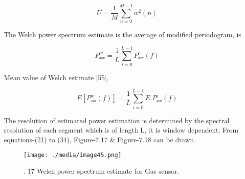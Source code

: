 \begin{equation}\tag{23}
U=\frac{1}{M} \sum _{n=0}^{M-1}w^{2} \left( n \right)
\end{equation}
\begin{justify}
The Welch power spectrum estimate is the average of modified periodogram, is
\end{justify}\par


\begin{equation}\tag{24}
P_{xx}^{w}=\frac{1}{L} \sum _{i=0}^{L-1}P_{xx}^{i} \left( f \right)
\end{equation}
\begin{justify}
Mean value of Welch estimate [55],
\end{justify}\par


\begin{equation}\tag{25}
E \left[ P_{xx}^{w} \left( f \right)  \right] =\frac{1}{L} \sum _{i=0}^{L-1}E.P_{xx}^{i} \left( f \right)
\end{equation}
\begin{justify}
The resolution of estimated power estimation is determined by the spectral resolution of each segment which is of length L, it is window dependent. From equations-(21) to (34), Figure-7.17 $\&$  Figure-7.18 can be drawn.
\end{justify}\par




\begin{figure}[H]
	\begin{Center}
		\texttt{[image: ./media/image45.png]}
		\caption{. 17 Welch power spectrum estimate for Gas sensor.}
		\label{fig:_17_Welch_power_spectrum_estimate_for_Gas_sensor}
	\end{Center}
\end{figure}



\par

\par


\vspace{\baselineskip}



